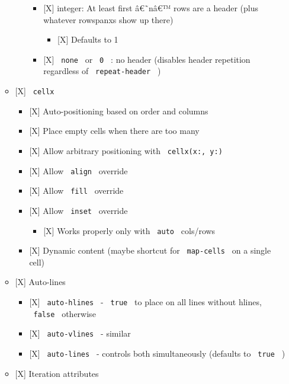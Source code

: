 \begin{itemize}
\begin{itemize}
\begin{itemize}
      \begin{itemize}
      \tightlist
      \item
        {[}X{]} integer: At least first â€˜nâ€™ rows are a header (plus
        whatever rowspanxs show up there)

        \begin{itemize}
        \tightlist
        \item
          {[}X{]} Defaults to 1
        \end{itemize}
      \item
        {[}X{]} \texttt{\ none\ } or \texttt{\ 0\ } : no header
        (disables header repetition regardless of
        \texttt{\ repeat-header\ } )
      \end{itemize}
    \end{itemize}
  \item
    {[}X{]} \texttt{\ cellx\ }

    \begin{itemize}
    \tightlist
    \item
      {[}X{]} Auto-positioning based on order and columns
    \item
      {[}X{]} Place empty cells when there are too many
    \item
      {[}X{]} Allow arbitrary positioning with
      \texttt{\ cellx(x:,\ y:)\ }
    \item
      {[}X{]} Allow \texttt{\ align\ } override
    \item
      {[}X{]} Allow \texttt{\ fill\ } override
    \item
      {[}X{]} Allow \texttt{\ inset\ } override

      \begin{itemize}
      \tightlist
      \item
        {[}X{]} Works properly only with \texttt{\ auto\ } cols/rows
      \end{itemize}
    \item
      {[}X{]} Dynamic content (maybe shortcut for \texttt{\ map-cells\ }
      on a single cell)
    \end{itemize}
  \item
    {[}X{]} Auto-lines

    \begin{itemize}
    \tightlist
    \item
      {[}X{]} \texttt{\ auto-hlines\ } - \texttt{\ true\ } to place on
      all lines without hlines, \texttt{\ false\ } otherwise
    \item
      {[}X{]} \texttt{\ auto-vlines\ } - similar
    \item
      {[}X{]} \texttt{\ auto-lines\ } - controls both simultaneously
      (defaults to \texttt{\ true\ } )
    \end{itemize}
  \item
    {[}X{]} Iteration attributes


\end{itemize}
\end{itemize}
